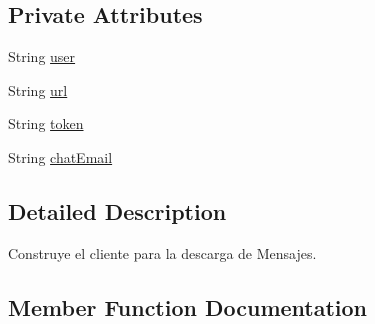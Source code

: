 \subsection*{Private Attributes}
\begin{DoxyCompactItemize}
\item 
String \hyperlink{classcom_1_1example_1_1sebastian_1_1tindertp_1_1chatTools_1_1ClientBuilder_a5689629482292f87ffd3c7786568f7d6}{user}
\item 
String \hyperlink{classcom_1_1example_1_1sebastian_1_1tindertp_1_1chatTools_1_1ClientBuilder_a7c433c4fc6c3c4d3e3f451e26e00f5c6}{url}
\item 
String \hyperlink{classcom_1_1example_1_1sebastian_1_1tindertp_1_1chatTools_1_1ClientBuilder_a4b37d07fc558a8cda6b6ce6a865ea8e6}{token}
\item 
String \hyperlink{classcom_1_1example_1_1sebastian_1_1tindertp_1_1chatTools_1_1ClientBuilder_abc4b53df08d44c92f674531ee3ec9a12}{chat\+Email}
\end{DoxyCompactItemize}


\subsection{Detailed Description}
Construye el cliente para la descarga de Mensajes. 

\subsection{Member Function Documentation}
